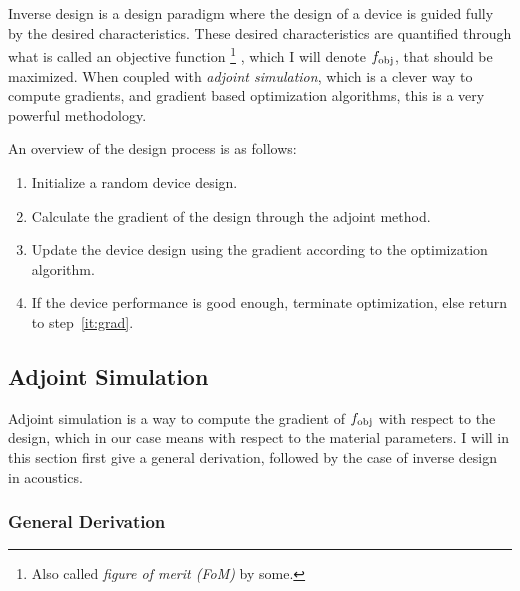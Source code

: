 Inverse design is a design paradigm where the design of a device is guided fully by
the desired characteristics.
These desired characteristics are quantified through what is called an objective
function%
\footnote{
	Also called \emph{figure of merit (FoM)} by some.%
}%
, which I will denote $f_\text{obj}$,
that should be maximized.
When coupled with \emph{adjoint simulation}, which is a clever way to compute
gradients, and gradient based optimization
algorithms, this is a very powerful methodology.

An overview of the design process is as follows:
\begin{enumerate}
	\item Initialize a random device design.
	\item\label{it:grad} Calculate the gradient of the design through the adjoint method.
	\item Update the device design using the gradient according to the optimization algorithm.
	\item If the device performance is good enough, terminate optimization, else
		return to step~\ref{it:grad}.
\end{enumerate}

\subsection{Adjoint Simulation}

Adjoint simulation is a way to compute the gradient of $f_\text{obj}$ with respect to
the design, which in our case means with respect to the material parameters.
I will in this section first give a general derivation, followed by the case of
inverse design in acoustics.

\subsubsection{General Derivation}

